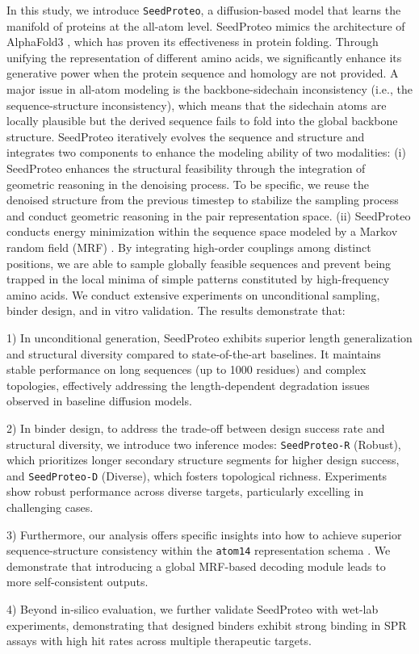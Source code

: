 In this study, we introduce \texttt{SeedProteo}, a diffusion-based model that learns the manifold of proteins at the all-atom level. SeedProteo mimics the architecture of AlphaFold3 \cite{abramsonAccurateStructurePrediction2024, wohlwendBoltz1DemocratizingBiomolecular2024, passaroAccurateEfficientBinding}, which has proven its effectiveness in protein folding. Through unifying the representation of different amino acids, we significantly enhance its generative power when the protein sequence and homology are not provided. A major issue in all-atom modeling is the backbone-sidechain inconsistency (i.e., the sequence-structure inconsistency), which means that the sidechain atoms are locally plausible but the derived sequence fails to fold into the global backbone structure. SeedProteo iteratively evolves the sequence and structure and integrates two components to enhance the modeling ability of two modalities:
(i) SeedProteo enhances the structural feasibility through the integration of geometric reasoning in the denoising process. To be specific, we reuse the denoised structure from the previous timestep \cite{chen2022analog} to stabilize the sampling process and conduct geometric reasoning in the pair representation space.
(ii) SeedProteo conducts energy minimization within the sequence space modeled by a Markov random field (MRF) \cite{metzler2005markov}. By integrating high-order couplings among distinct positions, we are able to sample globally feasible sequences and prevent being trapped in the local minima of simple patterns constituted by high-frequency amino acids.
We conduct extensive experiments on unconditional sampling, binder design, and in vitro validation. The results demonstrate that:

1) In unconditional generation, SeedProteo exhibits superior length generalization and structural diversity compared to state-of-the-art baselines. It maintains stable performance on long sequences (up to 1000 residues) and complex topologies, effectively addressing the length-dependent degradation issues observed in baseline diffusion models.


2) In binder design, to address the trade-off between design success rate and structural diversity, we introduce two inference modes: \texttt{SeedProteo-R} (Robust), which prioritizes longer secondary structure segments for higher design success, and \texttt{SeedProteo-D} (Diverse), which fosters topological richness. Experiments show robust performance across diverse targets, particularly excelling in challenging cases.


3) Furthermore, our analysis offers specific insights into how to achieve superior sequence-structure consistency within the \texttt{atom14} representation schema \cite{quPallatomUnlockingNew2025, butcher2025novo, starkUniversalBinderDesign}. We demonstrate that introducing a global MRF-based decoding module leads to more self-consistent outputs.


4) Beyond in-silico evaluation, we further validate SeedProteo with wet-lab experiments, demonstrating that designed binders exhibit strong binding in SPR assays with high hit rates across multiple therapeutic targets.

